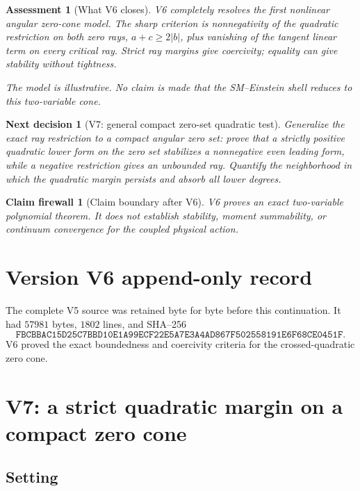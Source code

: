 \documentclass[11pt]{article}
\newtheorem{firewall}[theorem]{Claim firewall}
\newtheorem{decision}[theorem]{Next decision}
\newtheorem{assessment}[theorem]{Assessment}
\theoremstyle{remark}
\begin{document}
\begin{assessment}[What V6 closes]
\label{ass:v17v6-status}
V6 completely resolves the first nonlinear angular zero-cone model.
The sharp criterion is nonnegativity of the quadratic restriction on
both zero rays,
\(a+c\geq2|b|\), plus vanishing of the tangent linear term on every
critical ray.  Strict ray margins give coercivity; equality can give
stability without tightness.

The model is illustrative.  No claim is made that the
SM--Einstein shell reduces to this two-variable cone.
\end{assessment}

\begin{decision}[V7: general compact zero-set quadratic test]
\label{dec:v17v6-next}
Generalize the exact ray restriction to a compact angular zero set:
prove that a strictly positive quadratic lower form on the zero set
stabilizes a nonnegative even leading form, while a negative
restriction gives an unbounded ray.  Quantify the neighborhood in
which the quadratic margin persists and absorb all lower degrees.
\end{decision}

\begin{firewall}[Claim boundary after V6]
\label{fire:v17v6}
V6 proves an exact two-variable polynomial theorem.  It does not
establish stability, moment summability, or continuum convergence
for the coupled physical action.
\end{firewall}

\section*{Version V6 append-only record}
The complete V5 source was retained byte for byte before this
continuation.  It had \(57981\) bytes, \(1802\) lines, and SHA--256
\[
 \texttt{FBCBBAC15D25C7BBD10E1A99ECF22E5A7E3A4AD867F502558191E6F68CE0451F}.
\]
V6 proved the exact boundedness and coercivity criteria for the
crossed-quadratic zero cone.


\section{V7: a strict quadratic margin on a compact zero cone}
\label{sec:v17v7}

\subsection{Setting}
\end{document}
